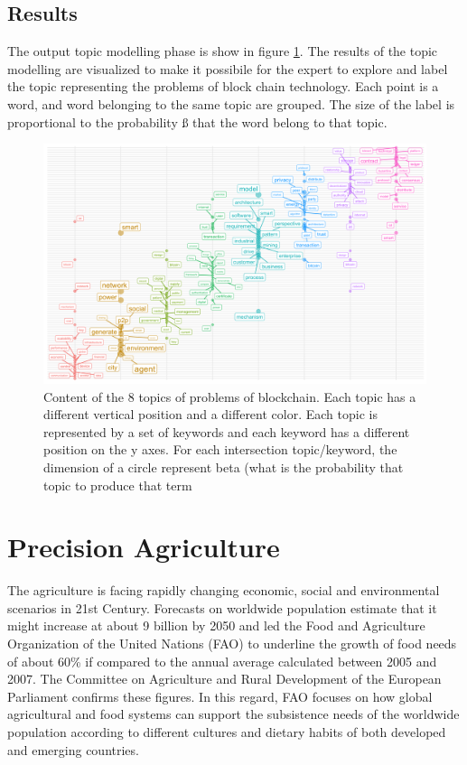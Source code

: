 \documentclass[]{book}
\begin{document}
\subsection{Results}\label{results-5}

The output topic modelling phase is show in figure
\ref{fig:topicmodelsoutputbc}. The results of the topic modelling are
visualized to make it possibile for the expert to explore and label the
topic representing the problems of block chain technology. Each point is
a word, and word belonging to the same topic are grouped. The size of
the label is proportional to the probability ß that the word belong to
that topic.

\begin{figure}

{\centering \includegraphics[width=0.6\linewidth]{_bookdown_files/figures/output_bl_topicmodels} 

}

\caption{Content of the 8 topics of problems of blockchain. Each topic has a different vertical position and a different color. Each topic is represented by a set of keywords and each keyword has a different position on the y axes. For each intersection topic/keyword, the dimension of a circle represent beta (what is the probability that topic to produce that term}\label{fig:topicmodelsoutputbc}
\end{figure}

\section{Precision Agriculture}\label{precision-agriculture}

The agriculture is facing rapidly changing economic, social and
environmental scenarios in 21st Century. Forecasts on worldwide
population estimate that it might increase at about 9 billion by 2050
and led the Food and Agriculture Organization of the United Nations
(FAO) to underline the growth of food needs of about 60\% if compared to
the annual average calculated between 2005 and 2007. The Committee on
Agriculture and Rural Development of the European Parliament confirms
these figures. In this regard, FAO focuses on how global agricultural
and food systems can support the subsistence needs of the worldwide
population according to different cultures and dietary habits of both
developed and emerging countries.
\end{document}

